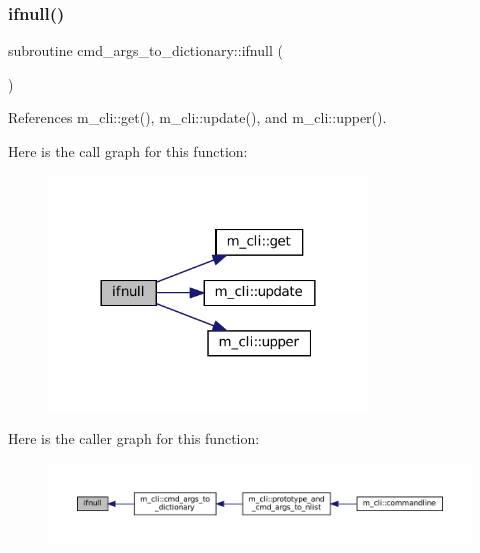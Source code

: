 \subsubsection{\texorpdfstring{ifnull()}{ifnull()}}
{\footnotesize\ttfamily subroutine cmd\+\_\+args\+\_\+to\+\_\+dictionary\+::ifnull (\begin{DoxyParamCaption}{ }\end{DoxyParamCaption})\hspace{0.3cm}{\ttfamily [private]}}



References m\+\_\+cli\+::get(), m\+\_\+cli\+::update(), and m\+\_\+cli\+::upper().

Here is the call graph for this function\+:\nopagebreak
\begin{figure}[H]
\begin{center}
\leavevmode
\includegraphics[width=240pt]{M__CLI_8f90_aa26f90016621d1ee43d3b5b66316532b_cgraph}
\end{center}
\end{figure}
Here is the caller graph for this function\+:\nopagebreak
\begin{figure}[H]
\begin{center}
\leavevmode
\includegraphics[width=350pt]{M__CLI_8f90_aa26f90016621d1ee43d3b5b66316532b_icgraph}
\end{center}
\end{figure}
